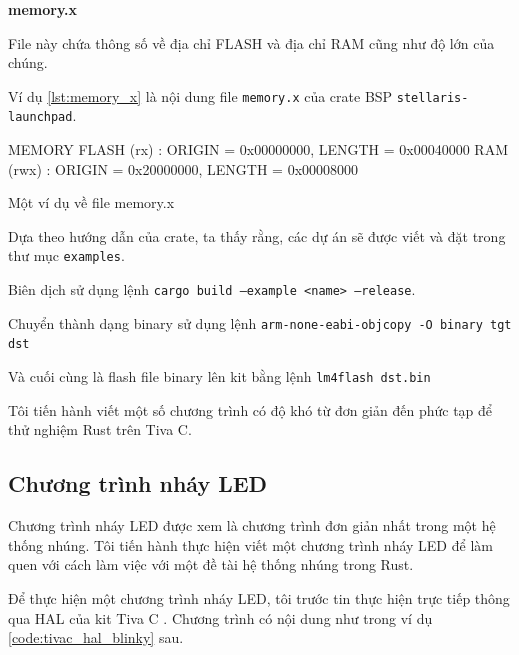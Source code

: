 \textbf{memory.x}

File này chứa thông số về địa chỉ FLASH và địa chỉ RAM cũng như độ lớn của chúng.

Ví dụ \ref{lst:memory_x} là nội dung file \texttt{memory.x} của crate BSP \texttt{stellaris-launchpad}.

\begin{listing}[ht]
\begin{plaintext}
MEMORY
{
    FLASH (rx) : ORIGIN = 0x00000000, LENGTH = 0x00040000
    RAM (rwx) : ORIGIN = 0x20000000, LENGTH = 0x00008000
}
\end{plaintext}
\caption{Một ví dụ về file memory.x}
\label{lst:memory_x}
\end{listing}

Dựa theo hướng dẫn của crate, ta thấy rằng, các dự án sẽ được viết và đặt trong thư mục \texttt{examples}.

Biên dịch sử dụng lệnh \texttt{cargo build --example <name> --release}.

Chuyển thành dạng binary sử dụng lệnh \texttt{arm-none-eabi-objcopy -O binary tgt dst}

Và cuối cùng là flash file binary lên kit bằng lệnh \texttt{lm4flash dst.bin}

Tôi tiến hành viết một số chương trình có độ khó từ đơn giản đến phức tạp để thử nghiệm Rust trên Tiva C.

\subsection{Chương trình nháy LED}
Chương trình nháy LED được xem là chương trình đơn giản nhất trong một hệ thống nhúng.
Tôi tiến hành thực hiện viết một chương trình nháy LED để làm quen với cách làm việc với một đề tài hệ thống nhúng trong Rust.

Để thực hiện một chương trình nháy LED, tôi trước tin thực hiện trực tiếp thông qua HAL của kit Tiva C \cite{tm4c_hal}.
Chương trình có nội dung như trong ví dụ \ref{code:tivac_hal_blinky} sau.

